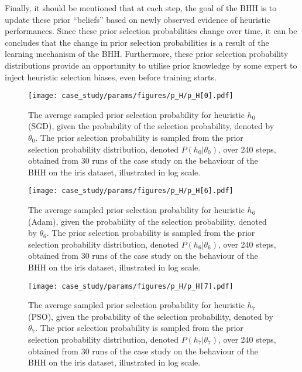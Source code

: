 Finally, it should be mentioned that at each step, the goal of the \acs{BHH} is to update these prior ``beliefs'' based on newly observed evidence of heuristic performances. Since these prior selection probabilities change over time, it can be concludes that the change in prior selection probabilities is a result of the learning mechanism of the \acs{BHH}. Furthermore, these prior selection probability distributions provide an opportunity to utilise prior knowledge by some expert to inject heuristic selection biases, even before training starts.

\begin{figure}[htpb]
	\centering
	\texttt{[image: case\_study/params/figures/p\_H/p\_H[0].pdf]}
	\caption{The average sampled prior selection probability for heuristic $h_{0}$ (\acs{SGD}), given the probability of the selection probability, denoted by $\theta_{0}$. The prior selection probability is sampled from the prior selection probability distribution, denoted $P(h_{0} \vert \theta_{0})$, over 240 steps, obtained from 30 runs of the case study on the behaviour of the \acs{BHH} on the iris dataset, illustrated in log scale.}
	\label{fig:results:case_study:p_H:0}
\end{figure}

\begin{figure}[htpb]
	\centering
	\texttt{[image: case\_study/params/figures/p\_H/p\_H[6].pdf]}
	\caption{The average sampled prior selection probability for heuristic $h_{6}$ (\acs{Adam}), given the probability of the selection probability, denoted by $\theta_{6}$. The prior selection probability is sampled from the prior selection probability distribution, denoted $P(h_{6} \vert \theta_{6})$, over 240 steps, obtained from 30 runs of the case study on the behaviour of the \acs{BHH} on the iris dataset, illustrated in log scale.}
	\label{fig:results:case_study:p_H:6}
\end{figure}

\begin{figure}[htpb]
	\centering
	\texttt{[image: case\_study/params/figures/p\_H/p\_H[7].pdf]}
	\caption{The average sampled prior selection probability for heuristic $h_{7}$ (\acs{PSO}), given the probability of the selection probability, denoted by $\theta_{7}$. The prior selection probability is sampled from the prior selection probability distribution, denoted $P(h_{7} \vert \theta_{7})$, over 240 steps, obtained from 30 runs of the case study on the behaviour of the \acs{BHH} on the iris dataset, illustrated in log scale.}
	\label{fig:results:case_study:p_H:7}
\end{figure}

